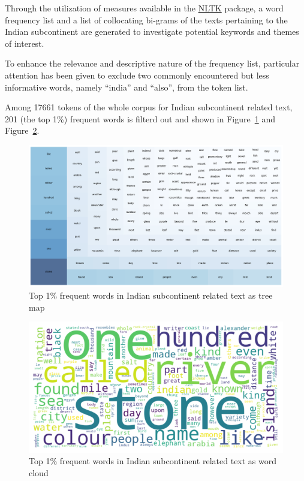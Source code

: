 \documentclass[
  12pt,
]{article}
\begin{document}
Through the utilization of measures available in the
\href{https://www.nltk.org/}{NLTK} package, a word frequency list and a
list of collocating bi-grams of the texts pertaining to the Indian
subcontinent are generated to investigate potential keywords and themes
of interest.

To enhance the relevance and descriptive nature of the frequency list,
particular attention has been given to exclude two commonly encountered
but less informative words, namely ``india'' and ``also'', from the
token list.

Among 17661 tokens of the whole corpus for Indian subcontinent related
text, 201 (the top 1\%) frequent words is filterd out and shown in
Figure~\ref{fig-freqwords_treemap} and
Figure~\ref{fig-freqwords_wordcloud}.

\begin{figure}[H]

{\centering \includegraphics{NHthesis_0728_files/figure-pdf/fig-freqwords_treemap-output-1.png}

}

\caption{\label{fig-freqwords_treemap}Top 1\% frequent words in Indian
subcontinent related text as tree map}

\end{figure}

\begin{figure}[H]

{\centering \includegraphics{NHthesis_0728_files/figure-pdf/fig-freqwords_wordcloud-output-1.png}

}

\caption{\label{fig-freqwords_wordcloud}Top 1\% frequent words in Indian
subcontinent related text as word cloud}

\end{figure}
\end{document}
